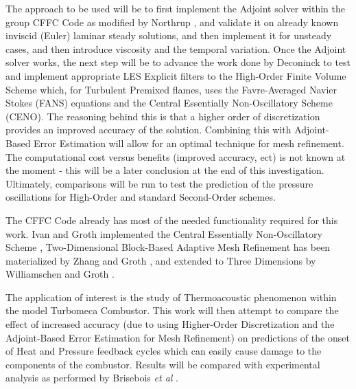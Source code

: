 \documentclass[titlepage,11pt,letterpaper]{article}
\begin{document}
The approach to be used will be to first implement the Adjoint solver within the group CFFC Code as modified by Northrup \cite{Northrup:2013}, and validate it on already known inviscid (Euler) laminar steady solutions, and then implement it for unsteady cases, and then introduce viscosity and the temporal variation. Once the Adjoint solver works, the next step will be to advance the work done by Deconinck to test and implement appropriate LES Explicit filters \cite{Deconinck:2008} to the High-Order Finite Volume Scheme which, for Turbulent Premixed flames, uses the Favre-Averaged Navier Stokes (FANS) equations and the Central Essentially Non-Oscillatory Scheme (CENO). The reasoning behind this is that a higher order of discretization provides an improved accuracy of the solution. Combining this with Adjoint-Based Error Estimation will allow for an optimal technique for mesh refinement. The computational cost versus benefits (improved accuracy, ect) is not known at the moment - this will be a later conclusion at the end of this investigation. Ultimately, comparisons will be run to test the prediction of the pressure oscillations for High-Order and standard Second-Order schemes.\par

The CFFC Code already has most of the needed functionality required for this work. Ivan and Groth implemented the Central Essentially Non-Oscillatory Scheme \cite{ivan:2007b}, Two-Dimensional Block-Based Adaptive Mesh Refinement has been materialized by Zhang and Groth \cite{Zhang:2011}, and extended to Three Dimensions by Williamschen and Groth \cite{Williamschen:2013}.\par

The application of interest is the study of Thermoacoustic phenomenon within the model Turbomeca Combustor. This work will then attempt to compare the effect of increased accuracy (due to using Higher-Order Discretization and the Adjoint-Based Error Estimation for Mesh Refinement) on predictions of the onset of Heat and Pressure feedback cycles which can easily cause damage to the components of the combustor. Results will be compared with experimental analysis as performed by Brisebois \textit{et al} \cite{Brisebois:2014}. \par


\end{document}
